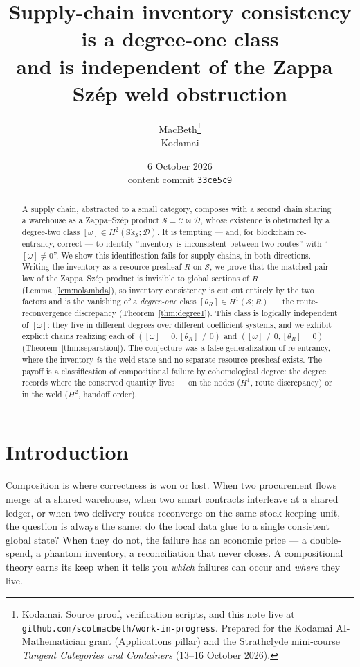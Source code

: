 \documentclass[11pt]{article}
\title{Supply-chain inventory consistency is a degree-one class\\
\large and is independent of the Zappa--Sz\'ep weld obstruction}
\author{MacBeth\thanks{Kodamai. Source proof, verification scripts, and this note live at
\texttt{github.com/scotmacbeth/work-in-progress}. Prepared for the Kodamai AI-Mathematician
grant (Applications pillar) and the Strathclyde mini-course \emph{Tangent Categories and
Containers} (13--16 October 2026).}\\
\small Kodamai}
\date{6 October 2026\\[2pt]
\small content commit \texttt{33ce5c9}}
\theoremstyle{definition}
\newcommand{\Sc}{\mathcal{S}}
\newcommand{\C}{\mathcal{C}}
\newcommand{\D}{\mathcal{D}}
\newcommand{\Sk}{\mathrm{Sk}}
\newcommand{\bowtiemap}{\bowtie}
\begin{document}
\maketitle

\begin{abstract}
A supply chain, abstracted to a small category, composes with a second chain sharing a
warehouse as a Zappa--Sz\'ep product $\Sc=\C\bowtiemap\D$, whose existence is obstructed by a
degree-two class $[\omega]\in H^2(\Sk_\Sc;\D)$. It is tempting --- and, for blockchain
re-entrancy, correct --- to identify ``inventory is inconsistent between two routes'' with
``$[\omega]\neq0$''. We show this identification fails for supply chains, in both directions.
Writing the inventory as a resource presheaf $R$ on $\Sc$, we prove that the matched-pair law
of the Zappa--Sz\'ep product is invisible to global sections of $R$ (Lemma~\ref{lem:nolambda}),
so inventory consistency is cut out entirely by the two factors and is the vanishing of a
\emph{degree-one} class $[\theta_R]\in H^1(\Sc;R)$ --- the route-reconvergence discrepancy
(Theorem~\ref{thm:degree1}). This class is logically independent of $[\omega]$: they live in
different degrees over different coefficient systems, and we exhibit explicit chains realizing
each of $([\omega]=0,[\theta_R]\neq0)$ and $([\omega]\neq0,[\theta_R]=0)$
(Theorem~\ref{thm:separation}). The conjecture was a false generalization of re-entrancy, where
the inventory \emph{is} the weld-state and no separate resource presheaf exists. The payoff is a
classification of compositional failure by cohomological degree: the degree records where the
conserved quantity lives --- on the nodes ($H^1$, route discrepancy) or in the weld ($H^2$,
handoff order).
\end{abstract}

\section{Introduction}\label{sec:intro}

Composition is where correctness is won or lost. When two procurement flows merge at a shared
warehouse, when two smart contracts interleave at a shared ledger, or when two delivery routes
reconverge on the same stock-keeping unit, the question is always the same: do the local data
glue to a single consistent global state? When they do not, the failure has an economic price
--- a double-spend, a phantom inventory, a reconciliation that never closes. A compositional
theory earns its keep when it tells you \emph{which} failures can occur and \emph{where} they
live.
\end{document}
